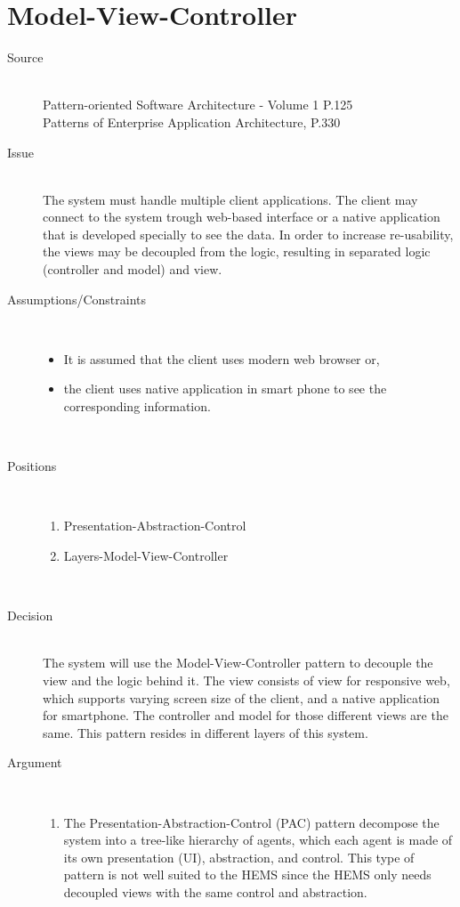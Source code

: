 \section{Model-View-Controller}
\begin{description}
\item [Source]~\\
Pattern-oriented Software Architecture - Volume 1 P.125 \cite{wiley-1}\\
Patterns of Enterprise Application Architecture, P.330 \cite{Fowler:2002:PEA:579257}

\item [Issue]~\\
The system must handle multiple client applications. The client may connect to the system trough web-based interface or a native application that is developed specially to see the data. In order to increase re-usability, the views may be decoupled from the logic, resulting in separated logic (controller and model) and view.

\item [Assumptions/Constraints]~
\begin{itemize}
\item It is assumed that the client uses modern web browser or,
\item the client uses native application in smart phone to see the corresponding information.
\end{itemize}
~\\[-1.5cm]

\item [Positions]~
\begin{enumerate}
\item Presentation-Abstraction-Control
\item Layers-Model-View-Controller
\end{enumerate}
~\\[-1.5cm]

\item [Decision] ~\\
The system will use the Model-View-Controller pattern to decouple the view and the logic behind it. The view consists of view for responsive web, which supports varying screen size of the client, and a native application for smartphone. The controller and model for those different views are the same. This pattern resides in different layers of this system.

\item [Argument]~
\begin{enumerate}
\item The Presentation-Abstraction-Control (PAC) pattern decompose the system into a tree-like hierarchy of agents, which each agent is made of its own presentation (UI), abstraction, and control. This type of pattern is not well suited to the HEMS since the HEMS only needs decoupled views with the same control and abstraction.


\end{enumerate}
\end{description}
